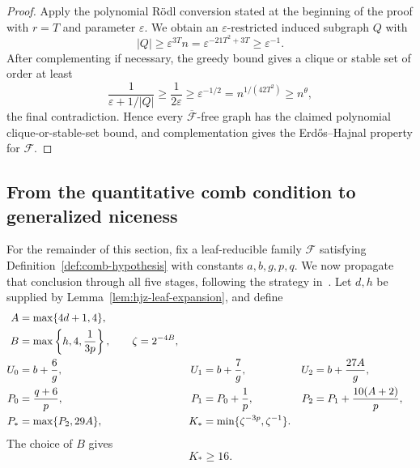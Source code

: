 \documentclass[11pt]{article}
\numberwithin{equation}{section}
\theoremstyle{plain}
\theoremstyle{definition}
\begin{document}
\begin{proof}
Apply the polynomial R\"odl conversion stated at the beginning of the
proof with $r=T$ and parameter $\varepsilon$.  We obtain an
$\varepsilon$-restricted induced subgraph $Q$ with
\[
 |Q|\geq\varepsilon^{3T}n
      =\varepsilon^{-21T^2+3T}
      \geq\varepsilon^{-1}.
\]
After complementing if necessary, the greedy bound gives a
clique or stable set of order at least
\[
 \frac1{\varepsilon+1/|Q|}
   \geq\frac1{2\varepsilon}
   \geq\varepsilon^{-1/2}
   =n^{1/(42T^2)}
   \geq n^\theta,
\]
the final contradiction.  Hence every
$\overline{\mathcal F}$-free graph has the claimed polynomial
clique-or-stable-set bound, and complementation gives the
Erd\H{o}s--Hajnal property for $\mathcal F$.
\end{proof}

\subsection{From the quantitative comb condition to generalized niceness}

For the remainder of this section, fix a leaf-reducible family
$\mathcal F$ satisfying Definition~\ref{def:comb-hypothesis} with
constants $a,b,g,p,q$.  We now propagate that conclusion through all
five stages, following the strategy in~\cite{HuangJuZhou2026}.  Let $d,h$ be supplied by
Lemma~\ref{lem:hjz-leaf-expansion}, and define
\begin{align}
 A&=\max\{4d+1,4\},\notag\\
 B&=\max\left\{h,4,\frac{1}{3p}\right\},\qquad
 \zeta=2^{-4B},\notag\\
 U_0&=b+\frac{6}{g},&
 U_1&=b+\frac{7}{g},&
 U_2&=b+\frac{27A}{g},\notag\\
 P_0&=\frac{q+6}{p},&
 P_1&=P_0+\frac{1}{p},&
 P_2&=P_1+\frac{10(A+2)}{p},\notag\\
 P_*&=\max\{P_2,29A\},&
 K_*&=\min\{\zeta^{-3p},\zeta^{-1}\}.
\label{eq:hjz-modified-constants}
\end{align}
The choice of $B$ gives
\begin{equation}
                         K_*\geq16.
\label{eq:hjz-kstar}
\end{equation}
\end{document}

